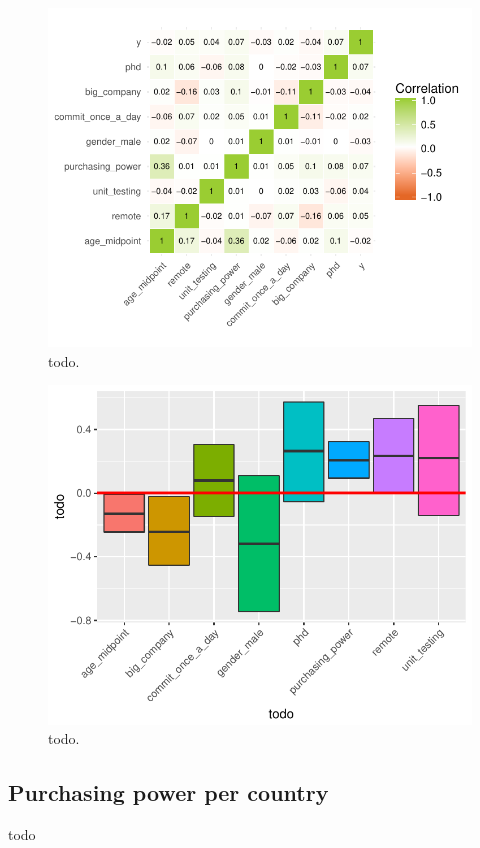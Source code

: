 \documentclass{article}
\begin{document}
\begin{figure}[H]
\centering
\includegraphics{report-017}
\caption{todo.}\label{fig_3}
\end{figure}


\begin{figure}[H]
\centering
\includegraphics{report-019}
\caption{todo.}\label{fig_4}
\end{figure}

\subsection{Purchasing power per country}
todo
\end{document}
